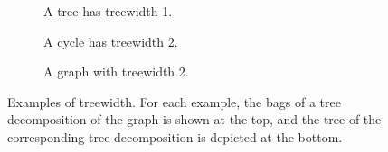 \begin{figure}
    \begin{subfigure}[b]{0.33\textwidth}
        \caption{A tree has treewidth 1.}
    \end{subfigure}
    \begin{subfigure}[b]{0.37\textwidth}
        \caption{A cycle has treewidth 2.}
    \end{subfigure}
    \begin{subfigure}[b]{0.3\textwidth}
        \caption{A graph with treewidth 2.}
    \end{subfigure}

    \caption{Examples of treewidth. For each example, the bags of a tree decomposition of the graph is shown at the top, and the tree of the corresponding tree decomposition is depicted at the bottom.}
    \label{fig:treewidth-example}
\end{figure}